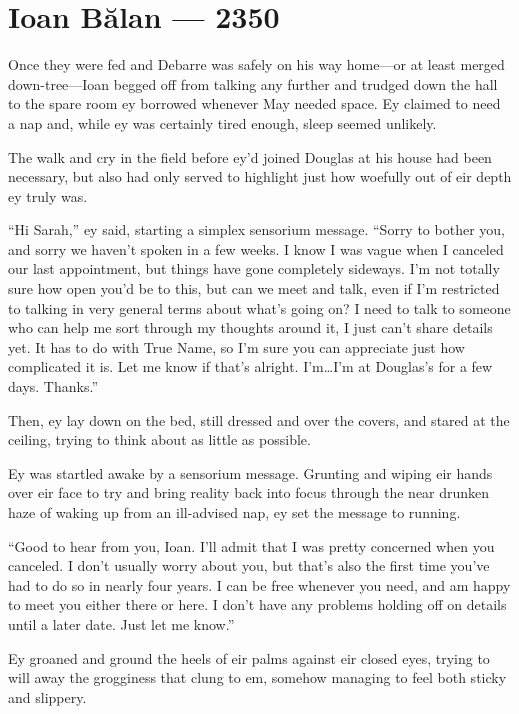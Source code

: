 \hypertarget{ioan-bux103lan-2350}{%
\chapter{Ioan Bălan — 2350}\label{ioan-bux103lan-2350}}

Once they were fed and Debarre was safely on his way home—or at least merged down-tree—Ioan begged off from talking any further and trudged down the hall to the spare room ey borrowed whenever May needed space. Ey claimed to need a nap and, while ey was certainly tired enough, sleep seemed unlikely.

The walk and cry in the field before ey'd joined Douglas at his house had been necessary, but also had only served to highlight just how woefully out of eir depth ey truly was.

``Hi Sarah,'' ey said, starting a simplex sensorium message. ``Sorry to bother you, and sorry we haven't spoken in a few weeks. I know I was vague when I canceled our last appointment, but things have gone completely sideways. I'm not totally sure how open you'd be to this, but can we meet and talk, even if I'm restricted to talking in very general terms about what's going on? I need to talk to someone who can help me sort through my thoughts around it, I just can't share details yet. It has to do with True Name, so I'm sure you can appreciate just how complicated it is. Let me know if that's alright. I'm\ldots I'm at Douglas's for a few days. Thanks.''

Then, ey lay down on the bed, still dressed and over the covers, and stared at the ceiling, trying to think about as little as possible.

Ey was startled awake by a sensorium message. Grunting and wiping eir hands over eir face to try and bring reality back into focus through the near drunken haze of waking up from an ill-advised nap, ey set the message to running.

``Good to hear from you, Ioan. I'll admit that I was pretty concerned when you canceled. I don't usually worry about you, but that's also the first time you've had to do so in nearly four years. I can be free whenever you need, and am happy to meet you either there or here. I don't have any problems holding off on details until a later date. Just let me know.''

Ey groaned and ground the heels of eir palms against eir closed eyes, trying to will away the grogginess that clung to em, somehow managing to feel both sticky and slippery.

